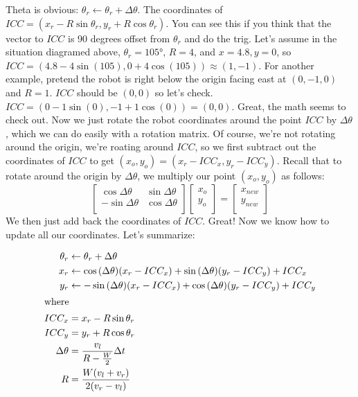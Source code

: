 \documentclass{article}
\begin{document}
Theta is obvious: $\theta_r \leftarrow \theta_r+\Delta\theta$. The coordinates of $ICC = (x_r-R\sin{\theta_r}, y_r+R\cos{\theta_r})$. You can see this if you think that the vector to $ICC$ is 90 degrees offset from $\theta_r$ and do the trig. Let's assume in the situation diagramed above, $\theta_r=\ang{105}$, $R=4$, and $x=4.8, y=0$, so $ICC = (4.8-4\sin{(105)}, 0+4\cos{(105)}) \approx (1, -1)$. For another example, pretend the robot is right below the origin facing east at $(0,-1,0)$ and $R=1$. $ICC$ should be $(0,0)$ so let's check. $ICC = (0-1\sin{(0)}, -1+1\cos{(0)}) = (0, 0).$ Great, the math seems to check out. Now we just rotate the robot coordinates around the point $ICC$ by $\Delta\theta$, which we can do easily with a rotation matrix. Of course, we're not rotating around the origin, we're roating around $ICC$, so we first subtract out the coordinates of $ICC$ to get $(x_o, y_o) = (x_r- ICC_x, y_r-ICC_y)$. Recall that to rotate around the origin by $\Delta\theta$, we multiply our point $(x_o, y_o)$ as follows:
\begin{equation}
  \begin{bmatrix}
    \cos{\Delta\theta} & \sin{\Delta\theta} \\
    -\sin{\Delta\theta} & \cos{\Delta\theta} \\
  \end{bmatrix}
  \begin{bmatrix}
    x_o \\
    y_o \\
  \end{bmatrix}
  =
  \begin{bmatrix}
    x_{new} \\
    y_{new} \\
  \end{bmatrix}
\end{equation}
We then just add back the coordinates of $ICC$. Great! Now we know how to update all our coordinates. Let's summarize:

\begin{align}
 \theta_r &\leftarrow \theta_r + \Delta\theta \\
  x_r &\leftarrow \cos{(\Delta\theta)}(x_r-ICC_x)+\sin{(\Delta\theta)}(y_r-ICC_y) + ICC_x \\
  y_r &\leftarrow -\sin{(\Delta\theta)}(x_r-ICC_x)+\cos{(\Delta\theta)}(y_r-ICC_y) + ICC_y \\
\shortintertext{where}
  ICC_x &= x_r-R\sin{\theta_r} \\
  ICC_y &= y_r+R\cos{\theta_r} \\
  \Delta\theta &= \dfrac{v_l}{R-\frac{W}{2}}\Delta t \\
  R &= \frac{W(v_l+v_r)}{2(v_r-v_l)}
\end{align}
\end{document}
